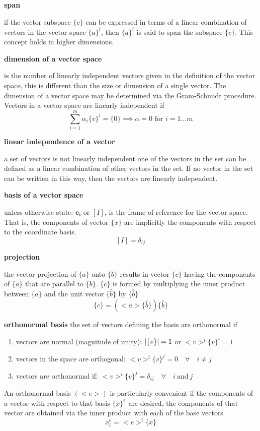 \documentclass[letterpaper, 10pt, oneside]{article}
\newenvironment{dd}[1]{
	\noindent
	\textbf{\normalsize{#1}}
	\hspace{0.1in}
	\small
	\rmfamily
	}
	{\medskip}
\DeclarePairedDelimiter\abs{\lvert}{\rvert}%
\begin{document}
\begin{dd}{span}
if the vector subspace $\{c\}$ can be expressed in terms of a linear combination of vectors in the vector space $\{a\}^i$, then $\{a\}^i$ is said to span the subspace $\{c\}$. This concept holds in higher dimensions.
\end{dd}

\begin{dd}{dimension of a vector space}
is  the number of linearly independent vectors given in the definition of the vector space, this is different than the size or dimension of a single vector. The dimension of a vector space may be determined via the Gram-Schmidt procedure.  Vectors in a vector space are linearly independent if
$$\sum_{i=1}^m \alpha_i \{v\}^i = \{0\} \implies \alpha = 0 \text{ for } i=1...m$$
\end{dd}

\begin{dd}{linear independence of a vector}
a set of vectors is not linearly independent one of the vectors in the set can be defined as a linear combination of other vectors in the set. If no vector in the set can be written in this way, then the vectors are linearly independent.
\end{dd}

\begin{dd}{basis of a vector space}
unless otherwise state: $\mathbf{e_i}$ or $[I]$, is the frame of reference for the vector space.  That is, the components of vector $\{x\}$ are implicitly the components with respect to the coordinate basis.
$$ [I] = \delta_{ij}$$
\end{dd}

\begin{dd}{projection} 
the vector projection of $\{a\}$ onto $\{b\}$ results in vector $\{c\}$ having the components of $\{a\}$ that are parallel to $\{b\}$. $\{c\}$ is formed by multiplying the inner product between $\{a\}$ and the unit vector $\{\hat{b}\}$ by 
$\{\hat{b}\}$ 
$$\{c\} = (<a>\{\hat{b}\})\{\hat{b}\}$$
\end{dd}

\begin{dd}{orthonormal basis} the set of vectors defining the basis are orthonormal if
	\begin{enumerate}
		\item vectors are normal (magnitude of unity): $\abs{\{v\}}=1$ or $<v>^i\{v\}^i=1$
		\item vectors in the space are orthogonal: $<v>^i\{v\}^j = 0 \quad \forall \quad i \ne j$
		\item vectors are orthonormal if: $<v>^i\{v\}^j = \delta_{ij} \quad \forall \quad i \ \text{and} \ j$
	\end{enumerate}
	An orthonormal basis $(<e>)$ is particularly convenient if the components of a vector with respect to that basis $\{x\}^e$ are desired, the components of that vector are obtained via the inner product with each of the base vectors
	$$x^e_i = <e>^i\{x\}$$

\end{dd}
\end{document}
